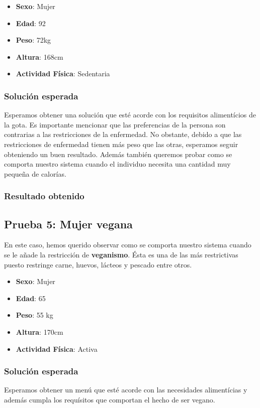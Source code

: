 \documentclass[12]{article}
\begin{document}
\begin{itemize}
\item \textbf{Sexo}: Mujer
\item \textbf{Edad}: 92
\item \textbf{Peso}: 72kg 
\item \textbf{Altura}: 168cm
\item \textbf{Actividad Física}: Sedentaria
\end{itemize}

\subsubsection{Solución esperada}
Esperamos obtener una solución que esté acorde con los requisitos alimentícios de la gota. Es importante mencionar que las preferencias de la persona son contrarias a las restricciones de la enfermedad. No obstante, debido a que las restricciones de enfermedad tienen más peso que las otras, esperamos seguir obteniendo un buen resultado. Además también queremos probar como se comporta nuestro sistema cuando el individuo necesita una cantidad muy pequeña de calorías. 

\subsubsection{Resultado obtenido}


\subsection{Prueba 5: Mujer vegana}
En este caso, hemos querido observar como se comporta nuestro sistema cuando se le añade la restricción de \textbf{veganismo}. Ésta es una de las más restrictivas puesto restringe carne, huevos, lácteos y pescado entre otros. 

\begin{itemize}
\item \textbf{Sexo}: Mujer
\item \textbf{Edad}: 65
\item \textbf{Peso}: 55 kg
\item \textbf{Altura}: 170cm
\item \textbf{Actividad Física}: Activa
\end{itemize}

\subsubsection{Solución esperada}
Esperamos obtener un menú que esté acorde con las necesidades alimentícias y además cumpla los requísitos que comportan el hecho de ser vegano.
\end{document}
